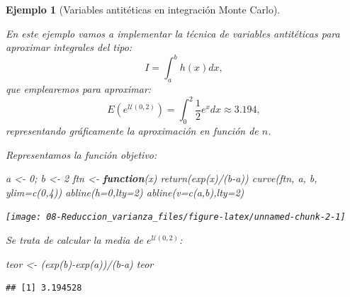 \documentclass[
]{book}
\newenvironment{Shaded}{\begin{snugshade}}{\end{snugshade}}
\newcommand{\AttributeTok}[1]{\textcolor[rgb]{0.77,0.63,0.00}{#1}}
\newcommand{\ControlFlowTok}[1]{\textcolor[rgb]{0.13,0.29,0.53}{\textbf{#1}}}
\newcommand{\DecValTok}[1]{\textcolor[rgb]{0.00,0.00,0.81}{#1}}
\newcommand{\FunctionTok}[1]{\textcolor[rgb]{0.00,0.00,0.00}{#1}}
\newcommand{\NormalTok}[1]{#1}
\newcommand{\OtherTok}[1]{\textcolor[rgb]{0.56,0.35,0.01}{#1}}
\newcommand{\SpecialCharTok}[1]{\textcolor[rgb]{0.00,0.00,0.00}{#1}}
\theoremstyle{break}
\newtheorem{example}{Ejemplo}[chapter]
\theoremstyle{nonumberplain}
\begin{document}
\begin{example}[Variables antitéticas en integración Monte Carlo]
\protect\hypertarget{exm:integrala}{}\label{exm:integrala}

En este ejemplo vamos a implementar la técnica de variables antitéticas para aproximar integrales del tipo:
\[I=\int_{a}^{b}h\left(  x\right)  dx,\]
que emplearemos para aproximar:
\[E\left(  e^{\mathcal{U}(0,2)}\right)  =\int_{0}^{2}\frac{1}{2}e^{x}dx \approx 3.194,\]
representando gráficamente la aproximación en función de \(n\).

Representamos la función objetivo:

\begin{Shaded}
\begin{Highlighting}[]
\NormalTok{a }\OtherTok{\textless{}{-}} \DecValTok{0}\NormalTok{; b }\OtherTok{\textless{}{-}} \DecValTok{2}
\NormalTok{ftn }\OtherTok{\textless{}{-}} \ControlFlowTok{function}\NormalTok{(x) }\FunctionTok{return}\NormalTok{(}\FunctionTok{exp}\NormalTok{(x)}\SpecialCharTok{/}\NormalTok{(b}\SpecialCharTok{{-}}\NormalTok{a))}
\FunctionTok{curve}\NormalTok{(ftn, a, b, }\AttributeTok{ylim=}\FunctionTok{c}\NormalTok{(}\DecValTok{0}\NormalTok{,}\DecValTok{4}\NormalTok{))}
\FunctionTok{abline}\NormalTok{(}\AttributeTok{h=}\DecValTok{0}\NormalTok{,}\AttributeTok{lty=}\DecValTok{2}\NormalTok{)}
\FunctionTok{abline}\NormalTok{(}\AttributeTok{v=}\FunctionTok{c}\NormalTok{(a,b),}\AttributeTok{lty=}\DecValTok{2}\NormalTok{)}
\end{Highlighting}
\end{Shaded}

\begin{center}\texttt{[image: 08-Reduccion\_varianza\_files/figure-latex/unnamed-chunk-2-1]} \end{center}

Se trata de calcular la media de \(e^{\mathcal{U}(0,2)}\):

\begin{Shaded}
\begin{Highlighting}[]
\NormalTok{teor }\OtherTok{\textless{}{-}}\NormalTok{ (}\FunctionTok{exp}\NormalTok{(b)}\SpecialCharTok{{-}}\FunctionTok{exp}\NormalTok{(a))}\SpecialCharTok{/}\NormalTok{(b}\SpecialCharTok{{-}}\NormalTok{a)}
\NormalTok{teor}
\end{Highlighting}
\end{Shaded}

\begin{verbatim}
## [1] 3.194528
\end{verbatim}


\end{example}
\end{document}
